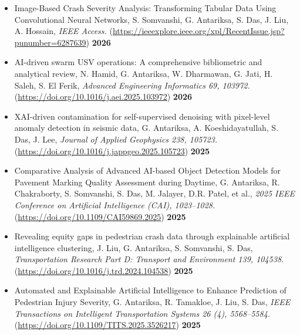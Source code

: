 \documentclass[10pt,a4paper]{article}
\begin{document}
\begin{itemize}

    \item Image-Based Crash Severity Analysis: Transforming Tabular Data Using Convolutional Neural Networks, S. Somvanshi, G. Antariksa, S. Das, J. Liu, A. Hossain, \textit{IEEE Access.} (\href{https://doi.org/10.1109/ACCESS.2026.3526217}{https://ieeexplore.ieee.org/xpl/RecentIssue.jsp?punumber=6287639}) \textbf{2026}

    \item AI-driven swarm USV operations: A comprehensive bibliometric and analytical review, N. Hamid, G. Antariksa, W. Dharmawan, G. Jati, H. Saleh, S. El Ferik, \textit{Advanced Engineering Informatics 69, 103972.} (\href{https://doi.org/10.1016/j.aei.2025.103972}{https://doi.org/10.1016/j.aei.2025.103972}) \textbf{2026}

    \item XAI-driven contamination for self-supervised denoising with pixel-level anomaly detection in seismic data, G. Antariksa, A. Koeshidayatullah, S. Das, J. Lee, \textit{Journal of Applied Geophysics 238, 105723.} (\href{https://doi.org/10.1016/j.jappgeo.2025.105723}{https://doi.org/10.1016/j.jappgeo.2025.105723}) \textbf{2025}

    \item Comparative Analysis of Advanced AI-based Object Detection Models for Pavement Marking Quality Assessment during Daytime, G. Antariksa, R. Chakraborty, S. Somvanshi, S. Das, M. Jalayer, D.R. Patel, et al., \textit{2025 IEEE Conference on Artificial Intelligence (CAI), 1023--1028.} (\href{https://doi.org/10.1109/CAI59869.2025}{https://doi.org/10.1109/CAI59869.2025}) \textbf{2025}

    \item Revealing equity gaps in pedestrian crash data through explainable artificial intelligence clustering, J. Liu, G. Antariksa, S. Somvanshi, S. Das, \textit{Transportation Research Part D: Transport and Environment 139, 104538.} (\href{https://doi.org/10.1016/j.trd.2024.104538}{https://doi.org/10.1016/j.trd.2024.104538}) \textbf{2025}

    \item Automated and Explainable Artificial Intelligence to Enhance Prediction of Pedestrian Injury Severity, G. Antariksa, R. Tamakloe, J. Liu, S. Das, \textit{IEEE Transactions on Intelligent Transportation Systems 26 (4), 5568--5584.} (\href{https://doi.org/10.1109/TITS.2025.3526217}{https://doi.org/10.1109/TITS.2025.3526217}) \textbf{2025}


\end{itemize}
\end{document}
